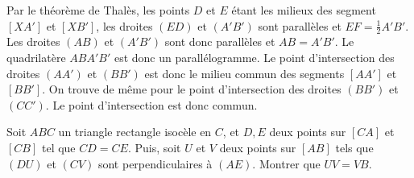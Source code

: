 \begin{sol}
\begin{center}
\end{center}

Par le théorème de Thalès, les points $D$ et $E$ étant les milieux des segment $[XA']$ et $[XB']$, les droites $(ED)$ et $(A'B')$ sont parallèles et $EF=\frac1{2}A'B'$. Les droites $(AB)$ et $(A'B')$ sont donc parallèles et $AB=A'B'$. Le quadrilatère $ABA'B'$ est donc un parallélogramme. Le point d'intersection des droites $(AA')$ et $(BB')$ est donc le milieu commun des segments $[AA']$ et $[BB']$. On trouve de même pour le point d'intersection des droites $(BB')$ et $(CC')$. Le point d'intersection est donc commun. 
\end{sol}

\begin{exo}
Soit $ABC$ un triangle rectangle isocèle en $C$, et $D,E$ deux points sur $[CA]$ et $[CB]$ tel que $CD=CE$. Puis, soit $U$ et $V$ deux points sur $[AB]$ tels que $(DU)$ et $(CV)$ sont perpendiculaires à $(AE)$. Montrer que $UV=VB$.
\end{exo}

